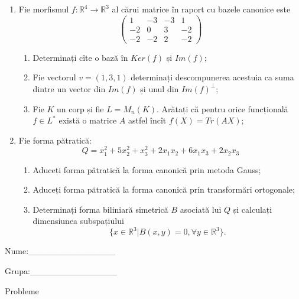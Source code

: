 \documentclass{article}
\begin{document}
\begin{enumerate}
 \item Fie morfismul $f:\mathbb{R}^4 \to \mathbb{R}^3$ al cărui matrice în raport cu bazele canonice este
$$\begin{pmatrix}
1&-3&-3&1\\
-2&0&3&-2\\
-2&-2&2&-2
\end{pmatrix}$$

\begin{enumerate}
\item Determinați cîte o bază în $Ker(f)$ și $Im(f)$;
\item Fie vectorul $v=(1,3,1)$ determinați descompunerea acestuia ca suma dintre un vector din $Im(f)$ și unul din $Im(f)^\perp$;
\item Fie $K$ un corp și fie $L=M_n(K)$. Arătați că pentru orice funcțională $f \in L^*$ există o matrice $A$ astfel încît $f(X)=Tr(AX)$;
\end{enumerate}
\item Fie forma pătratică:
$$Q= x_1^2+5x_2^2+x_3^2+2x_1x_2+6x_1x_3+2x_2x_3$$

\begin{enumerate}
\item Aduceți forma pătratică la forma canonică prin metoda Gauss;
\item Aduceți forma pătratică la forma canonică prin transformări ortogonale;
\item Determinați forma biliniară simetrică $B$ asociată lui $Q$ și calculați dimensiunea subspațiului
$$\{x \in \mathbb{R}^3 | B(x,y)=0,\forall y \in \mathbb{R}^3\}.$$

\end{enumerate}
\end{enumerate}
\newpage
\begin{flushright}
Nume:\_\_\_\_\_\_\_\_\_\_\_\_\_\_
 
 
Grupa:\_\_\_\_\_\_\_\_\_\_\_\_\_\_
\end{flushright}
\begin{center}
\vspace{2cm}
{\Large Probleme}
\vspace{2cm}
\end{center}
\end{document}
